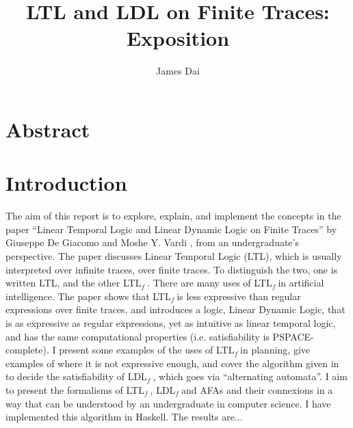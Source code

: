 \documentclass[11pt, oneside]{article}
\title{LTL and LDL on Finite Traces: Exposition} \author{James Dai}
\newcommand{\ltlf}{LTL$_f\ $}
\newcommand{\ldlf}{LDL$_f\ $}
\begin{document}
\maketitle \tableofcontents \newpage
\section{Abstract}


\section {Introduction}
\begin{comment}
The aim of this report is to discuss LTL in a relatively new setting, that of finite traces.
I mainly follow the arguments of Vardi and de Giacomo in the paper ``Linear Temporal Logic and Linear Dynamic Logic on Finite Traces'' \cite{ldlf},
as well as parts of their other papers in the same area.
A wide range of ideas are woven into this setting. Planning, processes, Dynamic Logic, alternating automata.
I also implement a satisfiability algorithm, though this is somewhat an afterthought. Or is it?? Well.
It is a bit of a makeshift thing to be honest.
\end{comment}
The aim of this report is to explore, explain, and implement the concepts in the paper
``Linear Temporal Logic and Linear Dynamic Logic on Finite Traces'' by Giuseppe De Giacomo and Moshe Y. Vardi \cite{ldlf},
from an undergraduate's perspective.
The paper discusses Linear Temporal Logic (LTL),
which is usually interpreted over infinite traces, over finite traces.
To distinguish the two, one is written LTL, and the other \ltlf.
There are many uses of \ltlf in artificial intelligence.
The paper shows that \ltlf is less expressive than regular expressions over finite traces,
and introduces a logic, Linear Dynamic Logic, that is as expressive as regular expressions,
yet as intuitive as linear temporal logic, and has the same computational properties (i.e. satisfiability is PSPACE-complete).
I present some examples of the uses of \ltlf in planning,
give examples of where it is not expressive enough,
and cover the algorithm given in \cite{ldlf} to decide the satisfiability of \ldlf,
which goes via ``alternating automata''.
I aim to present the formalisms of \ltlf, \ldlf and AFAs and their connexions in a way
that can be understood by an undergraduate in computer science.
I have implemented this algorithm in Haskell. The results are...

\end{document}
